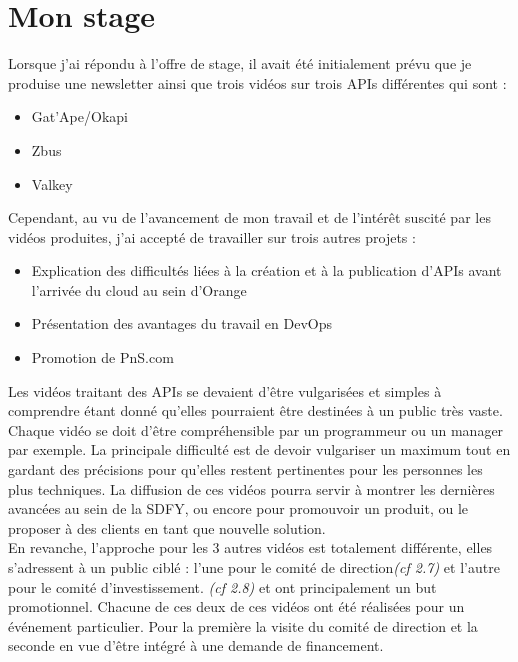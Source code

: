 \chapter{Mon stage}
\label{sec:unchapitre}

Lorsque j'ai répondu à l'offre de stage, il avait été initialement prévu que je produise une newsletter ainsi que trois vidéos sur trois APIs différentes qui sont :

\begin{itemize}
    \item Gat'Ape/Okapi
    \item Zbus
    \item Valkey
\end{itemize}

Cependant, au vu de l'avancement de mon travail et de l'intérêt suscité par les vidéos produites, j'ai accepté de travailler sur trois autres projets :

\begin{itemize}
    \item Explication des difficultés liées à la création et à la publication d'APIs avant l'arrivée du cloud au sein d'Orange
    \item Présentation des avantages du travail en DevOps
    \item Promotion de PnS.com
\end{itemize}



Les vidéos traitant des APIs se devaient d'être vulgarisées et simples à comprendre étant donné qu'elles pourraient être destinées à un public très vaste. Chaque vidéo se doit d'être compréhensible par un programmeur ou un manager par exemple. La principale difficulté est de devoir vulgariser un maximum tout en gardant des précisions pour qu'elles restent pertinentes pour les personnes les plus techniques. La diffusion de ces vidéos pourra servir à montrer les dernières avancées au sein de la SDFY, ou encore pour promouvoir un produit, ou le proposer à des clients en tant que nouvelle solution. \\

En revanche, l'approche pour les 3 autres vidéos est totalement différente, elles s'adressent à un public ciblé : l'une pour le comité de direction\textit{(cf 2.7)} et l'autre pour le comité d'investissement. \textit{(cf 2.8)} et ont principalement un but promotionnel. Chacune de ces deux de ces vidéos ont été réalisées pour un événement particulier. Pour la première la visite du comité de direction et la seconde en vue d'être intégré à une demande de financement. \\



